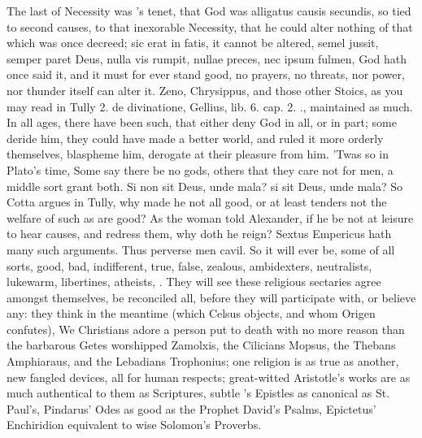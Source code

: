 {The last of Necessity was \Seneca's tenet, that God was alligatus causis
secundis, so tied to second causes, to that inexorable Necessity, that
he could alter nothing of that which was once decreed; sic erat in
fatis, it cannot be altered, semel jussit, semper paret Deus, nulla vis
rumpit, nullae preces, nec ipsum fulmen, God hath once said it, and it
must for ever stand good, no prayers, no threats, nor power, nor
thunder itself can alter it. Zeno, Chrysippus, and those other Stoics,
as you may read in Tully 2. de divinatione, Gellius, lib. 6. cap. 2.
\etc{}., maintained as much. In all ages, there have been such, that either
deny God in all, or in part; some deride him, they could have made a
better world, and ruled it more orderly themselves, blaspheme him,
derogate at their pleasure from him. 'Twas so in Plato's time,
Some say there be no gods, others that they care not for men, a middle
sort grant both. Si non sit Deus, unde mala? si sit Deus, unde mala? So
Cotta argues in Tully, why made he not all good, or at least tenders
not the welfare of such as are good? As the woman told Alexander, if he
be not at leisure to hear causes, and redress them, why doth he reign?
Sextus Empericus hath many such arguments. Thus perverse men
cavil. So it will ever be, some of all sorts, good, bad, indifferent,
true, false, zealous, ambidexters, neutralists, lukewarm, libertines,
atheists, \etc{}. They will see these religious sectaries agree amongst
themselves, be reconciled all, before they will participate with, or
believe any: they think in the meantime (which Celsus objects,
and whom Origen confutes), We Christians adore a person put to
death with no more reason than the barbarous Getes worshipped
Zamolxis, the Cilicians Mopsus, the Thebans Amphiaraus, and the
Lebadians Trophonius; one religion is as true as another, new fangled
devices, all for human respects; great-witted Aristotle's works are as
much authentical to them as Scriptures, subtle \Seneca's Epistles as
canonical as St. Paul's, Pindarus' Odes as good as the Prophet David's
Psalms, Epictetus' Enchiridion equivalent to wise Solomon's Proverbs.

}
